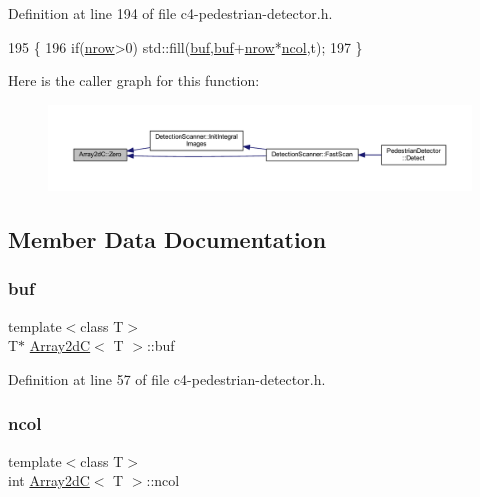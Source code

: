 Definition at line 194 of file c4-\/pedestrian-\/detector.\+h.


\begin{DoxyCode}
195 \{
196     \textcolor{keywordflow}{if}(\mbox{\hyperlink{class_array2d_c_a12f690f7195f7674a86a7e1eedbc473c}{nrow}}>0) std::fill(\mbox{\hyperlink{class_array2d_c_a25d8fa5049d4c7ded126e0acdd18f37a}{buf}},\mbox{\hyperlink{class_array2d_c_a25d8fa5049d4c7ded126e0acdd18f37a}{buf}}+\mbox{\hyperlink{class_array2d_c_a12f690f7195f7674a86a7e1eedbc473c}{nrow}}*\mbox{\hyperlink{class_array2d_c_a27e0f8f40f644831cd7c750db59dc28a}{ncol}},t);
197 \}
\end{DoxyCode}
Here is the caller graph for this function\+:
\nopagebreak
\begin{figure}[H]
\begin{center}
\leavevmode
\includegraphics[width=350pt]{class_array2d_c_a5e1d7837fd208699694fc3fc97151df0_icgraph}
\end{center}
\end{figure}


\subsection{Member Data Documentation}
\mbox{\label{class_array2d_c_a25d8fa5049d4c7ded126e0acdd18f37a}} 
\subsubsection{\texorpdfstring{buf}{buf}}
{\footnotesize\ttfamily template$<$class T$>$ \\
T$\ast$ \mbox{\hyperlink{class_array2d_c}{Array2dC}}$<$ T $>$\+::buf}



Definition at line 57 of file c4-\/pedestrian-\/detector.\+h.

\mbox{\label{class_array2d_c_a27e0f8f40f644831cd7c750db59dc28a}} 
\subsubsection{\texorpdfstring{ncol}{ncol}}
{\footnotesize\ttfamily template$<$class T$>$ \\
int \mbox{\hyperlink{class_array2d_c}{Array2dC}}$<$ T $>$\+::ncol}



